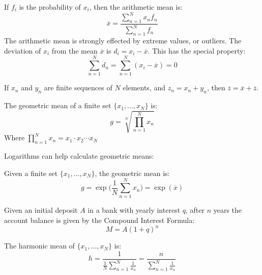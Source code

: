 \documentclass[crop=false,class=book,oneside]{standalone}
\begin{document}
        If $f_{i}$ is the probability of $x_{i}$, then the arithmetic mean is:
        \begin{equation*}
            \overline{x}=
            \frac{\sum_{n=1}^{N}x_{n}f_{n}}{\sum_{n=1}^{N}f_{n}}
        \end{equation*}
        The arithmetic mean is strongly effected by extreme values, or outliers.
        The deviation of $x_{i}$ from the mean $\overline{x}$
        is $d_{i}=x_{i}-\overline{x}$. This has the special property:
        \begin{equation*}
            \sum_{n=1}^{N}d_{n}
            =\sum_{n=1}^{N}(x_{i}-\overline{x})
            =0
        \end{equation*}
        \begin{theorem}
            If $x_{n}$ and $y_{n}$ are finite sequences of
            $N$ elements, and $z_{n}=x_{n}+y_{n}$, then
            $\overline{z}=\overline{x}+\overline{z}$.
        \end{theorem}
        \begin{definition}
            The geometric mean of a finite set
            $\{x_{1},\hdots,x_{N}\}$ is:
            \begin{equation*}
                g=\sqrt[N]{\prod_{n=1}^{N}x_{n}}
            \end{equation*}
            Where
            $\prod_{n=1}^{N}x_{n}=x_{1}\cdot{x_{2}}\cdots{x_{N}}$
        \end{definition}
        Logarithms can help calculate geometric means:
        \begin{theorem}
            Given a finite set $\{x_{1},\hdots,x_{N}\}$,
            the geometric mean is:
            \begin{equation*}
                g=\exp\Big(\frac{1}{N}\sum_{n=1}^{N}x_{n}\Big)
                =\exp(\overline{x})
            \end{equation*}
        \end{theorem}
        Given an initial deposit $A$ in a bank with yearly interest $q$,
        after $n$ years the account balance is given by the
        Compound Interest Formula:
        \begin{equation*}
            M=A(1+q)^{n}
        \end{equation*}
        \begin{definition}
            The harmonic mean of $\{x_{1},\hdots,x_{N}\}$
            is:
            \begin{equation*}
                h=\frac{1}{\frac{1}{N}\sum_{n=1}^{N}\frac{1}{x_{n}}}
                =\frac{n}{\sum_{n=1}^{N}\frac{1}{x_{n}}}
            \end{equation*}
        \end{definition}
\end{document}
